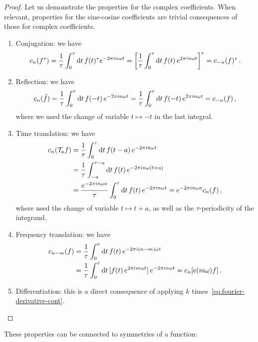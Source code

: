\begin{proof} Let us demonstrate the properties for the complex coefficients. When
  relevant, properties for the sine-cosine coefficients are trivial consequences of those
  for complex coefficients.
  \begin{enumerate}
    \item Conjugation: we have
      \begin{equation}
        c_n(f^*)=\frac{1}{\tau}\int_0^{\tau}\mathrm{d} t\, f(t)^*e^{-2\pi i n\omega t}
        =\left[\frac{1}{\tau}\int_0^{\tau}\mathrm{d} t\, f(t)\,e^{2\pi i n\omega t}\right]^*
        =c_{-n}(f)^*\,.
      \end{equation}
    \item Reflection: we have
      \begin{equation}
        c_n(\tilde{f})=\frac{1}{\tau}\int_0^{\tau}\mathrm{d} t\, f(-t)\,e^{-2\pi i n\omega t}
        =\frac{1}{\tau}\int_0^{\tau}\mathrm{d} t\, f(-t)\,e^{2\pi i n\omega t}=c_{-n}(f)\,,
      \end{equation}
      where we used the change of variable $t\mapsto -t$ in the last integral.
    \item Time translation: we have
      \begin{align}
        c_n(\mathcal{T}_af)&=\frac{1}{\tau}\int_0^{\tau}\mathrm{d} t\, f(t-a)\,
        e^{-2\pi i n\omega t}\\
        &=\frac{1}{\tau}\int_{-a}^{\tau-a}\mathrm{d} t\, f(t)\,e^{-2\pi i n\omega (t+a)}\\
        &=\frac{e^{-2\pi i n\omega a}}{\tau}\int_{0}^{\tau}\mathrm{d} t\, f(t)\,
        e^{-2\pi i n\omega t}
        =e^{-2\pi i n\omega a}c_n(f)\,,
      \end{align}
      where used the change of variable $t\mapsto t+a$, as well as the $\tau$-periodicity
      of the integrand.
    \item Frequency translation: we have
      \begin{align}
        c_{n-m}(f)&=\frac{1}{\tau}\int_0^{\tau}\mathrm{d} t\, f(t)\,e^{-2\pi i (n-m)\omega t}\\
        &=\frac{1}{\tau}\int_0^{\tau}\mathrm{d} t\,
        [f(t)\,e^{2\pi i m\omega t}]\,e^{-2\pi i n\omega t}=c_{n}[\operatorname{e}(m\omega)f]\,.
      \end{align}
    \item Differentiation: this is a direct consequence of applying $k$
      times~\cref{eq:fourier-derivative-cont}.
  \end{enumerate}
\end{proof}
These properties can be connected to symmetries of a function:
